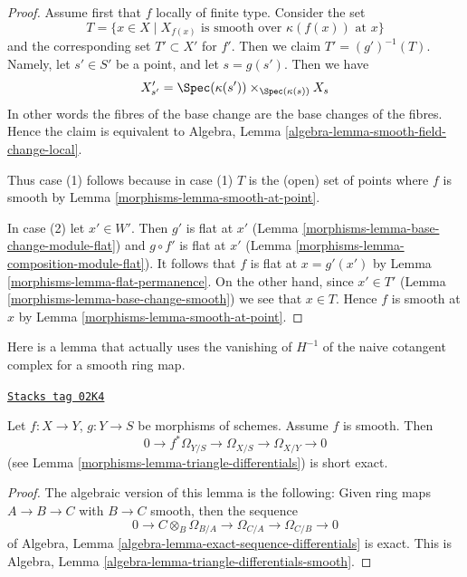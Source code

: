 \begin{proof}

Assume first that $f$ locally of finite type. Consider the set
$$
T = \{x \in X \mid X_{f(x)}\text{ is smooth over }\kappa(f(x))\text{ at }x\}
$$
and the corresponding set $T' \subset X'$ for $f'$. Then we claim
$T' = (g')^{-1}(T)$. Namely, let $s' \in S'$ be a point, and let
$s = g(s')$. Then we have
$$
X'_{s'} =
\Spec(\kappa(s')) \times_{\Spec(\kappa(s))} X_s
$$
In other words the fibres of the base change are the base changes
of the fibres. Hence the claim is equivalent to
Algebra, Lemma \ref{algebra-lemma-smooth-field-change-local}.

\medskip\noindent
Thus case (1) follows because in case (1) $T$ is the (open) set of points
where $f$ is smooth by Lemma \ref{morphisms-lemma-smooth-at-point}.

\medskip\noindent
In case (2) let $x' \in W'$. Then $g'$ is flat at $x'$
(Lemma \ref{morphisms-lemma-base-change-module-flat}) and
$g \circ f'$ is flat at $x'$ (Lemma \ref{morphisms-lemma-composition-module-flat}).
It follows that $f$ is flat at $x = g'(x')$
by Lemma \ref{morphisms-lemma-flat-permanence}. On the other hand, since
$x' \in T'$ (Lemma \ref{morphisms-lemma-base-change-smooth})
we see that $x \in T$. Hence $f$ is smooth at $x$ by
Lemma \ref{morphisms-lemma-smooth-at-point}.
\end{proof}

Here is a lemma that actually uses the vanishing of $H^{-1}$
of the naive cotangent complex for a smooth ring map.

\begin{lemma}
\label{morphisms-lemma-triangle-differentials-smooth}
\href{https://stacks.math.columbia.edu/tag/02K4}{\texttt{Stacks tag 02K4}}

Let $f : X \to Y$, $g : Y \to S$ be morphisms of schemes.
Assume $f$ is smooth. Then
$$
0 \to f^*\Omega_{Y/S} \to \Omega_{X/S} \to \Omega_{X/Y} \to 0
$$
(see Lemma \ref{morphisms-lemma-triangle-differentials}) is short exact.
\end{lemma}

\begin{proof}
The algebraic version of this lemma is the following:
Given ring maps $A \to B \to C$ with $B \to C$ smooth, then the sequence
$$
0 \to C \otimes_B \Omega_{B/A} \to \Omega_{C/A} \to \Omega_{C/B} \to 0
$$
of
Algebra, Lemma \ref{algebra-lemma-exact-sequence-differentials}
is exact. This is
Algebra, Lemma \ref{algebra-lemma-triangle-differentials-smooth}.
\end{proof}

